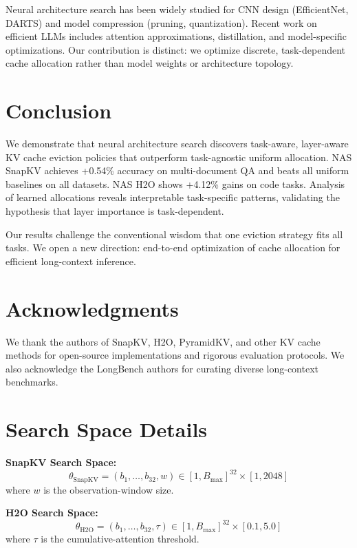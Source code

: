 \documentclass[11pt]{article}
\begin{document}
Neural architecture search has been widely studied for CNN design (EfficientNet, DARTS) and model compression (pruning, quantization). Recent work on efficient LLMs includes attention approximations, distillation, and model-specific optimizations. Our contribution is distinct: we optimize discrete, task-dependent cache allocation rather than model weights or architecture topology.

\section{Conclusion}

We demonstrate that neural architecture search discovers task-aware, layer-aware KV cache eviction policies that outperform task-agnostic uniform allocation. NAS SnapKV achieves +0.54\% accuracy on multi-document QA and beats all uniform baselines on all datasets. NAS H2O shows +4.12\% gains on code tasks. Analysis of learned allocations reveals interpretable task-specific patterns, validating the hypothesis that layer importance is task-dependent.

Our results challenge the conventional wisdom that one eviction strategy fits all tasks. We open a new direction: end-to-end optimization of cache allocation for efficient long-context inference.

\section*{Acknowledgments}

We thank the authors of SnapKV, H2O, PyramidKV, and other KV cache methods for open-source implementations and rigorous evaluation protocols. We also acknowledge the LongBench authors for curating diverse long-context benchmarks.




\appendix

\section{Search Space Details}

\textbf{SnapKV Search Space:}
\[
\theta_{\text{SnapKV}} = (b_1, \ldots, b_{32}, w) \in [1, B_{\max}]^{32} \times [1, 2048]
\]
where $w$ is the observation-window size.

\textbf{H2O Search Space:}
\[
\theta_{\text{H2O}} = (b_1, \ldots, b_{32}, \tau) \in [1, B_{\max}]^{32} \times [0.1, 5.0]
\]
where $\tau$ is the cumulative-attention threshold.
\end{document}
